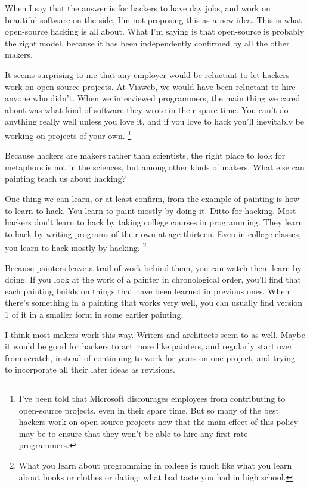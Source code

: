 \documentclass[12pt]{book}
\begin{document}
When I say that the answer is for hackers to have day jobs, and work on
beautiful software on the side, I'm not proposing this as a new idea.
This is what open-source hacking is all about. What I'm saying is that
open-source is probably the right model, because it has been
independently confirmed by all the other makers.

It seems surprising to me that any employer would be reluctant to let
hackers work on open-source projects. At Viaweb, we would have been
reluctant to hire anyone who didn't. When we interviewed programmers,
the main thing we cared about was what kind of software they wrote in
their spare time. You can't do anything really well unless you love it,
and if you love to hack you'll inevitably be working on projects of your
own. \footnote{I've been told that Microsoft discourages employees from
contributing to open-source projects, even in their spare time. But so
many of the best hackers work on open-source projects now that the main
effect of this policy may be to ensure that they won't be able to hire
any first-rate programmers.}

Because hackers are makers rather than scientists, the right place to
look for metaphors is not in the sciences, but among other kinds of
makers. What else can painting teach us about hacking?

One thing we can learn, or at least confirm, from the example of
painting is how to learn to hack. You learn to paint mostly by doing it.
Ditto for hacking. Most hackers don't learn to hack by taking college
courses in programming. They learn to hack by writing programs of their
own at age thirteen. Even in college classes, you learn to hack mostly
by hacking. \footnote{What you learn about programming in college is much like what
you learn about books or clothes or dating: what bad taste you had in
high school.}

Because painters leave a trail of work behind them, you can watch them
learn by doing. If you look at the work of a painter in chronological
order, you'll find that each painting builds on things that have been
learned in previous ones. When there's something in a painting that
works very well, you can usually find version 1 of it in a smaller form
in some earlier painting.

I think most makers work this way. Writers and architects seem to as
well. Maybe it would be good for hackers to act more like painters, and
regularly start over from scratch, instead of continuing to work for
years on one project, and trying to incorporate all their later ideas as
revisions.
\end{document}

